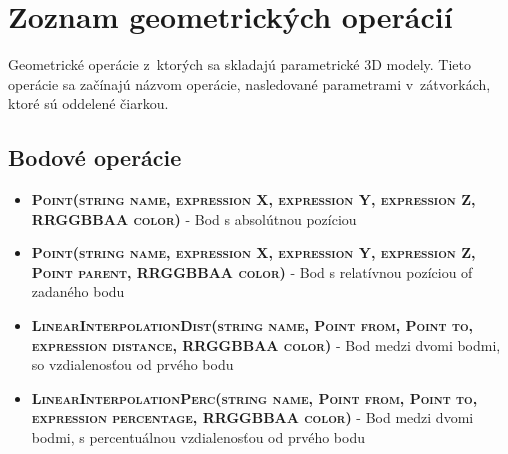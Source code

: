 \chapter{Zoznam geometrických operácií}
\label{Priloha:zoznamGeometrickychOperacii}
Geometrické operácie z~ktorých sa skladajú parametrické 3D modely. Tieto operácie sa začínajú názvom operácie, nasledované parametrami v~zátvorkách, ktoré sú oddelené čiarkou.

\section*{Bodové operácie}
\begin{itemize}


\item \textsc{\textbf{Point(string name, expression X, expression Y, expression Z, RRGGBBAA color)}} - Bod s absolútnou pozíciou 
\item \textsc{\textbf{Point(string name, expression X, expression Y, expression Z, Point parent, RRGGBBAA color)}} - Bod s relatívnou pozíciou of zadaného bodu

\item \textsc{\textbf{LinearInterpolationDist(string name, Point from, Point to, expression distance, RRGGBBAA color)}} - Bod medzi dvomi bodmi, so vzdialenosťou od prvého bodu
		 
\item \textsc{\textbf{LinearInterpolationPerc(string name, Point from, Point to, expression percentage, RRGGBBAA color)}} - Bod medzi dvomi bodmi, s percentuálnou vzdialenosťou od prvého bodu


\end{itemize}
